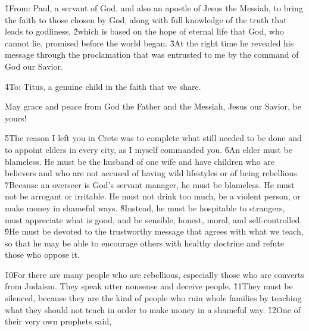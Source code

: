 


\v{1}From: Paul, a servant of God, and also an apostle of Jesus the Messiah, to bring the faith to those chosen by God, along with full knowledge of the truth that leads to godliness, \v{2}which is based on the hope of eternal life that God, who cannot lie, promised before the world began. \v{3}At the right time he revealed his message through the proclamation that was entrusted to me by the command of God our Savior.

\v{4}To: Titus, a genuine child in the faith that we share.

May grace and peace from God the Father and the Messiah, Jesus our Savior, be yours!

\v{5}The reason I left you in Crete was to complete what still needed to be done and to appoint elders in every city, as I myself commanded you. \v{6}An elder must be blameless. He must be the husband of one wife and have children who are believers and who are not accused of having wild lifestyles or of being rebellious. \v{7}Because an overseer is God's servant manager, he must be blameless. He must not be arrogant or irritable. He must not drink too much, be a violent person, or make money in shameful ways. \v{8}Instead, he must be hospitable to strangers, must appreciate what is good, and be sensible, honest, moral, and self-controlled. \v{9}He must be devoted to the trustworthy message that agrees with what we teach, so that he may be able to encourage others with healthy doctrine and refute those who oppose it.

\v{10}For there are many people who are rebellious, especially those who are converts from Judaism. They speak utter nonsense and deceive people. \v{11}They must be silenced, because they are the kind of people who ruin whole families by teaching what they should not teach in order to make money in a shameful way. \v{12}One of their very own prophets said,


